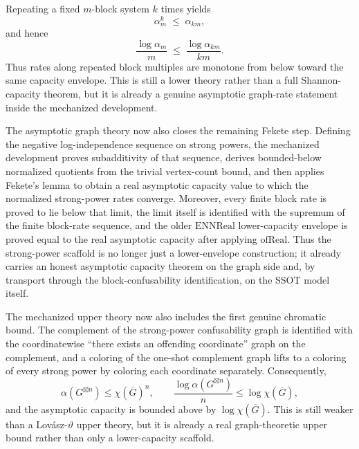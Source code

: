 Repeating a fixed $m$-block system $k$ times yields
\[
\alpha_m^k \;\le\; \alpha_{km},
\]
and hence
\[
\frac{\log \alpha_m}{m} \;\le\; \frac{\log \alpha_{km}}{km}.
\]
Thus rates along repeated block multiples are monotone from below toward the same capacity envelope. This is still a lower theory rather than a full Shannon-capacity theorem, but it is already a genuine asymptotic graph-rate statement inside the mechanized development.

The asymptotic graph theory now also closes the remaining Fekete step. Defining the negative log-independence sequence on strong powers, the mechanized development proves subadditivity of that sequence, derives bounded-below normalized quotients from the trivial vertex-count bound, and then applies Fekete's lemma to obtain a real asymptotic capacity value to which the normalized strong-power rates converge. Moreover, every finite block rate is proved to lie below that limit, the limit itself is identified with the supremum of the finite block-rate sequence, and the older $\mathrm{ENNReal}$ lower-capacity envelope is proved equal to the real asymptotic capacity after applying $\mathrm{ofReal}$. Thus the strong-power scaffold is no longer just a lower-envelope construction; it already carries an honest asymptotic capacity theorem on the graph side and, by transport through the block-confusability identification, on the SSOT model itself.

The mechanized upper theory now also includes the first genuine chromatic bound. The complement of the strong-power confusability graph is identified with the coordinatewise ``there exists an offending coordinate'' graph on the complement, and a coloring of the one-shot complement graph lifts to a coloring of every strong power by coloring each coordinate separately. Consequently,
\[
\alpha(G^{\boxtimes n}) \le \chi(\overline G)^n,
\qquad
\frac{\log \alpha(G^{\boxtimes n})}{n} \le \log \chi(\overline G),
\]
and the asymptotic capacity is bounded above by $\log \chi(\overline G)$. This is still weaker than a Lov\'asz-$\vartheta$ upper theory, but it is already a real graph-theoretic upper bound rather than only a lower-capacity scaffold.


